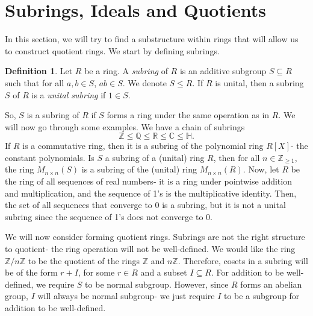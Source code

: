 \documentclass[a4paper, openany]{memoir}
\theoremstyle{definition}
\newtheorem{definition}{Definition}[section]
\theoremstyle{plain}
\begin{document}
\section{Subrings, Ideals and Quotients}
In this section, we will try to find a substructure within rings that will allow us to construct quotient rings. We start by defining subrings.
\begin{definition}
Let $R$ be a ring. A \emph{subring} of $R$ is an additive subgroup $S \subseteq R$ such that for all $a, b \in S$, $ab \in S$. We denote $S \leqslant R$. If $R$ is unital, then a subring $S$ of $R$ is a \emph{unital subring} if $1 \in S$.
\end{definition}
\noindent So, $S$ is a subring of $R$ if $S$ forms a ring under the same operation as in $R$. We will now go through some examples. We have a chain of subrings
\[\mathbb{Z} \leqslant \mathbb{Q} \leqslant \mathbb{R} \leqslant \mathbb{C} \leqslant \mathbb{H}.\]
If $R$ is a commutative ring, then it is a subring of the polynomial ring $R[X]$- the constant polynomials. Is $S$ a subring of a (unital) ring $R$, then for all $n \in \mathbb{Z}_{\geqslant 1}$, the ring $M_{n \times n}(S)$ is a subring of the (unital) ring $M_{n \times n}(R)$. Now, let $R$ be the ring of all sequences of real numbers- it is a ring under pointwise addition and multiplication, and the sequence of 1's is the multiplicative identity. Then, the set of all sequences that converge to 0 is a subring, but it is not a unital subring since the sequence of 1's does not converge to 0.

We will now consider forming quotient rings. Subrings are not the right structure to quotient- the ring operation will not be well-defined. We would like the ring $\mathbb{Z}/n \mathbb{Z}$ to be the quotient of the rings $\mathbb{Z}$ and $n \mathbb{Z}$. Therefore, cosets in a subring will be of the form $r + I$, for some $r \in R$ and a subset $I \subseteq R$. For addition to be well-defined, we require $S$ to be normal subgroup. However, since $R$ forms an abelian group, $I$ will always be normal subgroup- we just require $I$ to be a subgroup for addition to be well-defined. 
\end{document}
